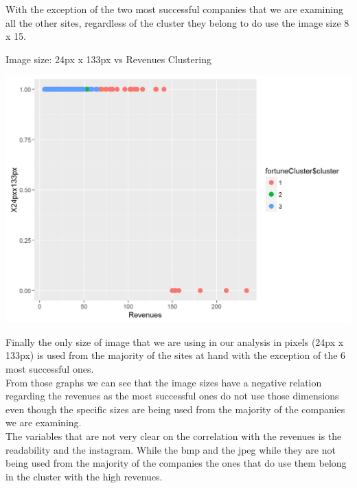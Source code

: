 \documentclass{article}
\begin{document}
With the exception of the two most successful companies that we are examining all the other sites, regardless of the cluster they belong to do use the image size 8 x 15.
\begin{table}[H]
\centering
\caption{Image size: 24px x 133px vs Revenues Clustering}
\begin{center}
\includegraphics[scale=0.4]{../R/photos/99_clust_24px.png}   \\
\end{center}
\end{table}
Finally the only size of image that we are using in our analysis  in pixels (24px x 133px) is used from the majority of the sites at hand with the exception of the 6 most successful ones.\\
From those graphs we can see that the image sizes have a negative relation regarding the revenues as the most successful ones do not use those dimensions even though the specific sizes are being used from the majority of the companies we are examining.\\
The variables that are not very clear on the correlation with the revenues is the readability and the instagram. While the bmp and the jpeg while they are not being used from the majority of the companies the ones that do use them belong in the cluster with the high revenues.
\end{document}
